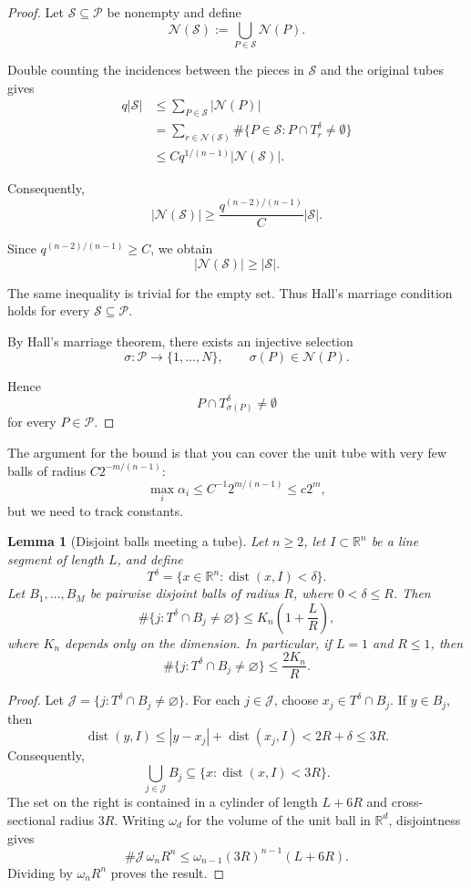 \documentclass[11pt, letterpaper]{nyjm}
\newtheorem{lemma}[theorem]{Lemma}
\begin{document}
	\begin{proof}
		Let $\mathcal S\subseteq\mathcal P$ be nonempty and define
		\[
		\mathcal N(\mathcal S)
		:=
		\bigcup_{P\in\mathcal S}\mathcal N(P).
		\]
		
		Double counting the incidences between the pieces
		in $\mathcal S$ and the original tubes gives
		\[
		\begin{aligned}
			q|\mathcal S|
			&\le \sum_{P\in\mathcal S}|\mathcal N(P)|\\
			&=
			\sum_{r\in\mathcal N(\mathcal S)}
			\#\{P\in\mathcal S:
			P\cap T_r^\delta\neq\emptyset\}\\
			&\le
			Cq^{1/(n-1)}|\mathcal N(\mathcal S)|.
		\end{aligned}
		\]
		
		Consequently,
		\[
		\boxed{
			|\mathcal N(\mathcal S)|
			\ge
			\frac{q^{(n-2)/(n-1)}}{C}
			|\mathcal S|.
		}
		\]
		
		Since $q^{(n-2)/(n-1)}\ge C$, we obtain
		\[
		|\mathcal N(\mathcal S)|\ge|\mathcal S|.
		\]
		
		The same inequality is trivial for the empty set.
		Thus Hall's marriage condition holds for every
		$\mathcal S\subseteq\mathcal P$.
		
		By Hall's marriage theorem, there exists an
		injective selection
		\[
		\sigma:\mathcal P\longrightarrow\{1,\ldots,N\},
		\qquad
		\sigma(P)\in\mathcal N(P).
		\]
		
		Hence
		\[
		P\cap T_{\sigma(P)}^\delta\neq\emptyset
		\]
		for every $P\in\mathcal P$.
	\end{proof}
	The argument for the bound is that you can cover the unit tube with very few balls of radius $C2^{-m/(n-1)}$: 
	\[
	\max_i \alpha_i \leq C^{-1}2^{m/(n-1)} \leq c2^{m},
	\]
	but we need to track constants.
	\begin{lemma}[Disjoint balls meeting a tube]
		Let $n\ge2$, let $I\subset\mathbb{R}^n$ be a line segment
		of length $L$, and define
		\[
		T^\delta=\{x\in\mathbb{R}^n:\operatorname{dist}(x,I)<\delta\}.
		\]
		Let $B_1,\ldots,B_M$ be pairwise disjoint balls of radius $R$,
		where $0<\delta\le R$. Then
		\[
		\#\{j:T^\delta\cap B_j\ne\varnothing\}
		\le K_n\left(1+\frac{L}{R}\right),
		\]
		where $K_n$ depends only on the dimension.
		In particular, if $L=1$ and $R\le1$, then
		\[
		\#\{j:T^\delta\cap B_j\ne\varnothing\}\le \frac{2K_n}{R}.
		\]
	\end{lemma}
	
	\begin{proof}
		Let $\mathcal{J}=\{j:T^\delta\cap B_j\ne\varnothing\}$.
		For each $j\in\mathcal{J}$, choose $x_j\in T^\delta\cap B_j$.
		If $y\in B_j$, then
		\[
		\operatorname{dist}(y,I)
		\le |y-x_j|+\operatorname{dist}(x_j,I)
		<2R+\delta\le3R.
		\]
		Consequently,
		\[
		\bigcup_{j\in\mathcal{J}}B_j
		\subseteq\{x:\operatorname{dist}(x,I)<3R\}.
		\]
		The set on the right is contained in a cylinder of length
		$L+6R$ and cross-sectional radius $3R$.
		Writing $\omega_d$ for the volume of the unit ball in
		$\mathbb{R}^d$, disjointness gives
		\[
		\#\mathcal{J}\,\omega_n R^n
		\le \omega_{n-1}(3R)^{n-1}(L+6R).
		\]
		Dividing by $\omega_n R^n$ proves the result.
	\end{proof}
	
\end{document}
